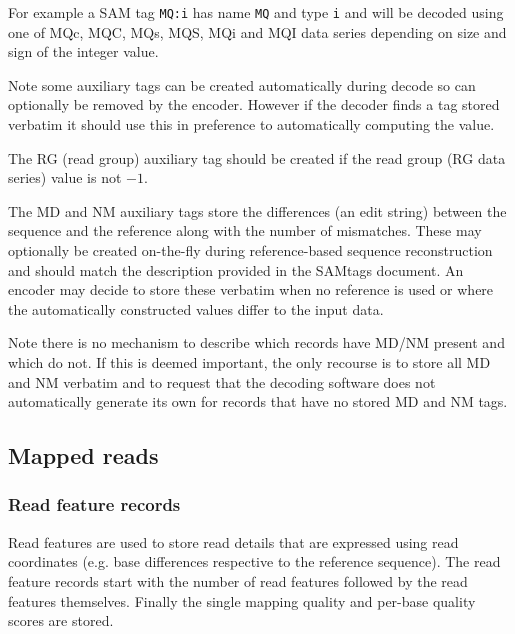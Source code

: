 \documentclass[a4paper]{article}
\begin{document}
For example a SAM tag \texttt{MQ:i} has name \texttt{MQ} and type \texttt{i} and will be decoded using one of MQc, MQC, MQs, MQS, MQi and MQI data series depending on size and sign of the integer value.

Note some auxiliary tags can be created automatically during decode so can optionally be removed by the encoder.
However if the decoder finds a tag stored verbatim it should use this in preference to automatically computing the value.

The RG (read group) auxiliary tag should be created if the read group (RG data series) value is not $-1$.

The MD and NM auxiliary tags store the differences (an edit string) between the sequence and the reference along with the number of mismatches.
These may optionally be created on-the-fly during reference-based sequence reconstruction and should match the description provided in the SAMtags document.
An encoder may decide to store these verbatim when no reference is used or where the automatically constructed values differ to the input data.

Note there is no mechanism to describe which records have MD/NM present and which do not.
If this is deemed important, the only recourse is to store all MD and NM verbatim and to request that the decoding software does not automatically generate its own for records that have no stored MD and NM tags.

\subsection{\textbf{Mapped reads}}
\label{subsec:mapped}

\subsubsection*{\textbf{Read feature records}}
\label{subsec:features}

Read features are used to store read details that are expressed using read coordinates 
(e.g. base differences respective to the reference sequence). The read feature 
records start with the number of read features followed by the read features themselves.
Finally the single mapping quality and per-base quality scores are stored.
\end{document}
